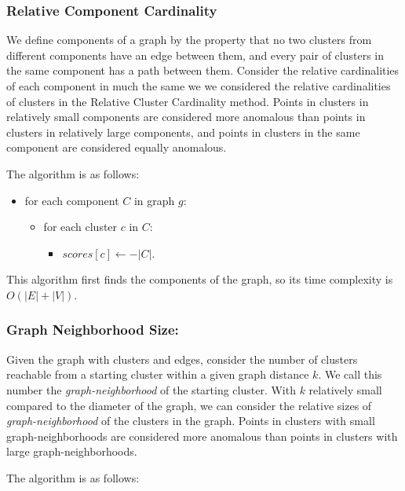 \subsubsection{Relative Component Cardinality}
We define components of a graph by the property that no two clusters from different components have an edge between them, and every pair of clusters in the same component has a path between them.
Consider the relative cardinalities of each component in much the same we we considered the relative cardinalities of clusters in the Relative Cluster Cardinality method.
Points in clusters in relatively small components are considered more anomalous than points in clusters in relatively large components, and points in clusters in the same component are considered equally anomalous.

The algorithm is as follows:

\begin{itemize}
    \item for each component $C$ in graph $g$:
    \begin{itemize}
        \item for each cluster $c$ in $C$:
        \begin{itemize}
            \item $scores[c] \leftarrow -|C|$.
        \end{itemize}
    \end{itemize}
\end{itemize}

This algorithm first finds the components of the graph, so its time complexity is $O(|E| + |V|)$.

\subsubsection{Graph Neighborhood Size:}
Given the graph with clusters and edges, consider the number of clusters reachable from a starting cluster within a given graph distance $k$.
We call this number the \textit{graph-neighborhood} of the starting cluster.
With $k$ relatively small compared to the diameter of the graph, we can consider the relative sizes of \textit{graph-neighborhood} of the clusters in the graph.
Points in clusters with small graph-neighborhoods are considered more anomalous than points in clusters with large graph-neighborhoods.

The algorithm is as follows:

